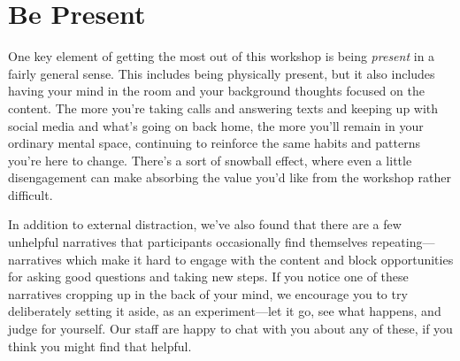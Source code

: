 \clearpage
\section*{Be Present}

One key element of getting the most out of this workshop is being \emph{present} in a fairly general sense. This includes being physically present, but it also includes having your mind in the room and your background thoughts focused on the content. The more you're taking calls and answering texts and keeping up with social media and what's going on back home, the more you'll remain in your ordinary mental space, continuing to reinforce the same habits and patterns you're here to change.  There's a sort of snowball effect, where even a little disengagement can make absorbing the value you'd like from the workshop rather difficult.

In addition to external distraction, we've also found that there are a few unhelpful narratives that participants occasionally find themselves repeating---narratives which make it hard to engage with the content and block opportunities for asking good questions and taking new steps.  If you notice one of these narratives cropping up in the back of your mind, we encourage you to try deliberately setting it aside, as an experiment---let it go, see what happens, and judge for yourself.  Our staff are happy to chat with you about any of these, if you think you might find that helpful.

